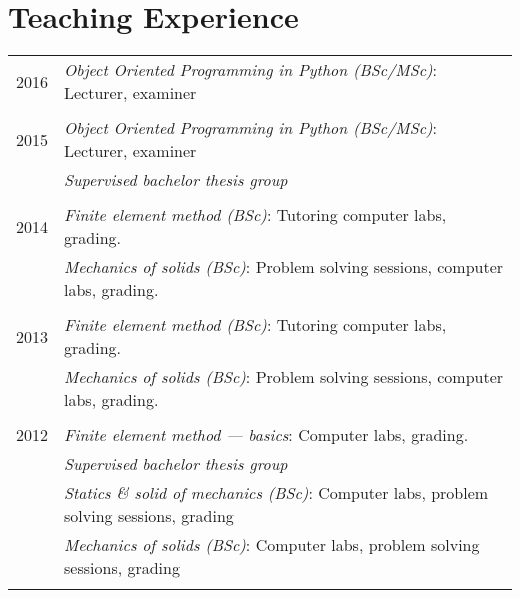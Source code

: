 \documentclass[a4paper,10pt]{article} %
\begin{document}
{\begin{tabular}{r|p{11cm}}
\end{tabular}


\section{Teaching Experience}

\begin{tabular}{r|p{11cm}}
\textsc{2016} 
              & \emph{Object Oriented Programming in Python (BSc/MSc)}: \footnotesize{Lecturer, examiner}\\
\multicolumn{2}{c}{} \\

\textsc{2015} 
	      & \emph{Object Oriented Programming in Python (BSc/MSc)}: \footnotesize{Lecturer, examiner}\\
              & \emph{Supervised bachelor thesis group}\\
\multicolumn{2}{c}{} \\

\textsc{2014} 
              & \emph{Finite element method (BSc)}: \footnotesize{Tutoring computer labs, grading.}\\
              & \emph{Mechanics of solids (BSc)}: \footnotesize{Problem solving sessions, computer labs, grading.}\\
\multicolumn{2}{c}{} \\

\textsc{2013} 
              & \emph{Finite element method (BSc)}: \footnotesize{Tutoring computer labs, grading.}\\
              & \emph{Mechanics of solids (BSc)}: \footnotesize{Problem solving sessions, computer labs, grading.}\\
\multicolumn{2}{c}{} \\


\textsc{2012} 
              & \emph{Finite element method --- basics}: \footnotesize{Computer labs, grading.}\\
              & \emph{Supervised bachelor thesis group}\\
              & \emph{Statics \& solid of mechanics (BSc)}: \footnotesize{Computer labs, problem solving sessions, grading}\\
              & \emph{Mechanics of solids (BSc)}: \footnotesize{Computer labs, problem solving sessions, grading}\\
\multicolumn{2}{c}{} \\


\end{tabular}}
\end{document}
